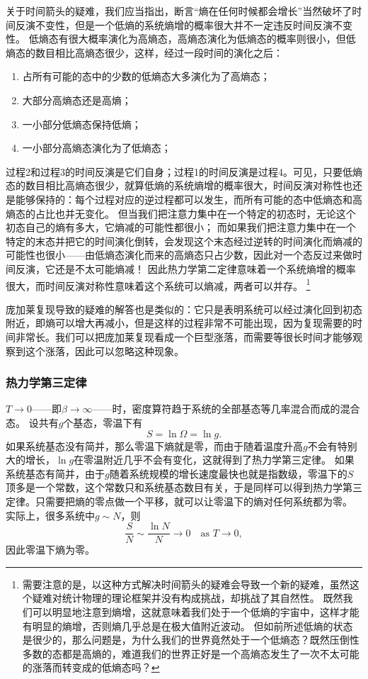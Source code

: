 \documentclass[hyperref, UTF8, a4paper]{ctexart}
\begin{document}
关于时间箭头的疑难，我们应当指出，断言“熵在任何时候都会增长”当然破坏了时间反演不变性，但是一个低熵的系统熵增的概率很大并不一定违反时间反演不变性。
低熵态有很大概率演化为高熵态，高熵态演化为低熵态的概率则很小，但低熵态的数目相比高熵态很少，这样，经过一段时间的演化之后：
\begin{enumerate}
    \item 占所有可能的态中的少数的低熵态大多演化为了高熵态；
    \item 大部分高熵态还是高熵；
    \item 一小部分低熵态保持低熵；
    \item 一小部分高熵态演化为了低熵态；
\end{enumerate}
过程2和过程3的时间反演是它们自身；过程1的时间反演是过程4。可见，只要低熵态的数目相比高熵态很少，就算低熵的系统熵增的概率很大，时间反演对称性也还是能够保持的：每个过程对应的逆过程都可以发生，而所有可能的态中低熵态和高熵态的占比也并无变化。
但当我们把注意力集中在一个特定的初态时，无论这个初态自己的熵有多大，它熵减的可能性都很小；
而如果我们把注意力集中在一个特定的末态并把它的时间演化倒转，会发现这个末态经过逆转的时间演化而熵减的可能性也很小——由低熵态演化而来的高熵态只占少数，因此对一个态反过来做时间反演，它还是不太可能熵减！
因此热力学第二定律意味着一个系统熵增的概率很大，而时间反演对称性意味着这个系统可以熵减，两者可以并存。%
\footnote{需要注意的是，以这种方式解决时间箭头的疑难会导致一个新的疑难，虽然这个疑难对统计物理的理论框架并没有构成挑战，却挑战了其自然性。
既然我们可以明显地注意到熵增，这就意味着我们处于一个低熵的宇宙中，这样才能有明显的熵增，否则熵几乎总是在极大值附近波动。
但如前所述低熵的状态是很少的，那么问题是，为什么我们的世界竟然处于一个低熵态？既然压倒性多数的态都是高熵的，难道我们的世界正好是一个高熵态发生了一次不太可能的涨落而转变成的低熵态吗？}%

庞加莱复现导致的疑难的解答也是类似的：它只是表明系统可以经过演化回到初态附近，即熵可以增大再减小，但是这样的过程非常不可能出现，因为复现需要的时间非常长。我们可以把庞加莱复现看成一个巨型涨落，而需要等很长时间才能够观察到这个涨落，因此可以忽略这种现象。

\subsubsection{热力学第三定律}

$T\to 0$——即$\beta \to \infty$——时，密度算符趋于系统的全部基态等几率混合而成的混合态。
设共有$g$个基态，零温下有
\[
    S = \ln \Omega = \ln g.
\]
如果系统基态没有简并，那么零温下熵就是零，而由于随着温度升高$g$不会有特别大的增长，$\ln g$在零温附近几乎不会有变化，这就得到了热力学第三定律。
如果系统基态有简并，由于$g$随着系统规模的增长速度最快也就是指数级，零温下的$S$顶多是一个常数，这个常数只和系统基态数目有关，于是同样可以得到热力学第三定律。只需要把熵的零点做一个平移，就可以让零温下的熵对任何系统都为零。
实际上，很多系统中$g \sim N$，则
\[
    \frac{S}{N} \sim \frac{\ln N}{N} \to 0 \quad \text{as } T \to 0,
\]
因此零温下熵为零。
\end{document}
